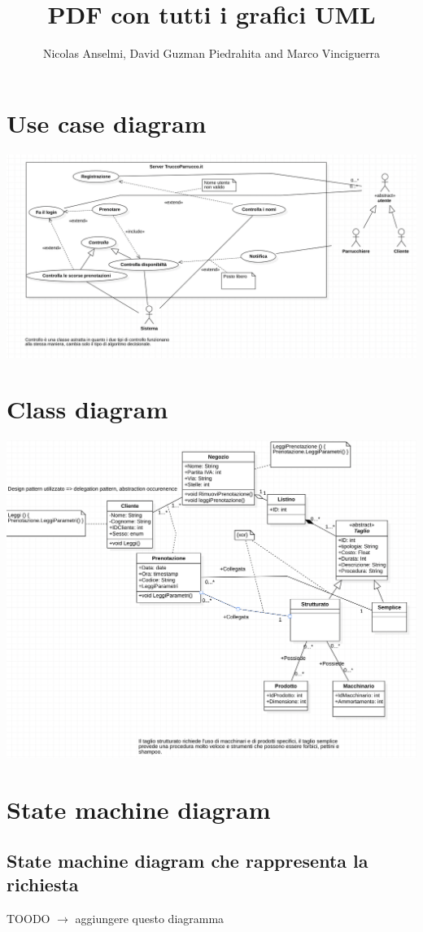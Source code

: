 \documentclass{article}
\title{PDF con tutti i grafici UML}
\author{Nicolas Anselmi, David Guzman Piedrahita and Marco Vinciguerra}
\begin{document}
\maketitle
\section{Use case diagram}

\includegraphics[scale = 0.5]{Immagini/UseCaseDiagram.png}

\section{Class diagram}
\includegraphics[scale = 0.5]{Immagini/ClassDiagram.png}

\section{State machine diagram}
\subsection{State machine diagram che rappresenta la richiesta}
TOODO $\rightarrow$ aggiungere questo diagramma
\end{document}
